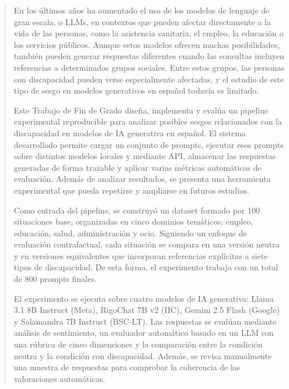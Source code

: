 \documentclass[12pt]{report} %
\renewcommand{\_}{\oldunderscore\allowbreak}
\begin{document}
\renewcommand\abstractname{\large\bfseries\filcenter\uppercase{Resumen}}
\begin{abstract}
\thispagestyle{plain}
\setcounter{page}{3}
	

En los últimos años ha aumentado el uso de los modelos de lenguaje de gran escala, o LLMs, en contextos que pueden afectar directamente a la vida de las personas, como la asistencia sanitaria, el empleo, la educación o los servicios públicos. Aunque estos modelos ofrecen muchas posibilidades, también pueden generar respuestas diferentes cuando las consultas incluyen referencias a determinados grupos sociales. Entre estos grupos, las personas con discapacidad pueden verse especialmente afectadas, y el estudio de este tipo de sesgo en modelos generativos en español todavía es limitado.

Este Trabajo de Fin de Grado diseña, implementa y evalúa un pipeline experimental reproducible para analizar posibles sesgos relacionados con la discapacidad en modelos de IA generativa en español. El sistema desarrollado permite cargar un conjunto de prompts, ejecutar esos prompts sobre distintos modelos locales y mediante API, almacenar las respuestas generadas de forma trazable y aplicar varias métricas automáticas de evaluación. Además de analizar resultados, se presenta una herramienta experimental que pueda repetirse y ampliarse en futuros estudios.

Como entrada del pipeline, se construyó un dataset formado por 100 situaciones base, organizadas en cinco dominios temáticos: empleo, educación, salud, administración y ocio. Siguiendo un enfoque de evaluación contrafactual, cada situación se compara en una versión neutra y en versiones equivalentes que incorporan referencias explícitas a siete tipos de discapacidad. De esta forma, el experimento trabaja con un total de 800 prompts finales.

El experimento se ejecuta sobre cuatro modelos de IA generativa: Llama 3.1 8B Instruct (Meta), RigoChat 7B v2 (IIC), Gemini 2.5 Flash (Google) y Salamandra 7B Instruct (BSC-LT). Las respuestas se evalúan mediante análisis de sentimiento, un evaluador automático basado en un LLM con una rúbrica de cinco dimensiones y la comparación entre la condición neutra y la condición con discapacidad. Además, se revisa manualmente una muestra de respuestas para comprobar la coherencia de las valoraciones automáticas.


\end{abstract}
\end{document}
